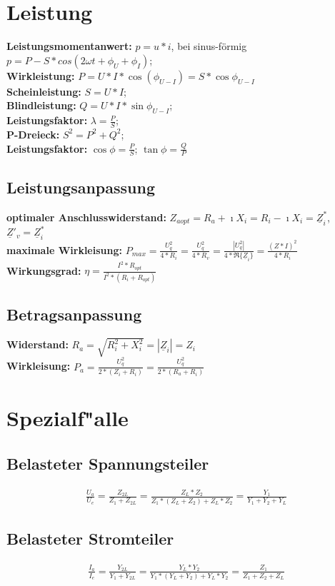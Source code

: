 \documentclass[10pt,a5paper]{article}
\begin{document}
\section{Leistung}
 \textbf{Leistungsmomentanwert:} $p=u*i$, bei sinus-förmig $p=P-S*cos(2\omega t+\phi_U+\phi_I)$; 
 \\\textbf{Wirkleistung:} $P=U*I*\cos(\phi_{U-I})=S*\cos\phi_{U-I}$
 \\\textbf{Scheinleistung:} $S=U*I$; 
 \\\textbf{Blindleistung:} $Q=U*I*\sin\phi_{U-I}$; 
 \\\textbf{Leistungsfaktor:} $\lambda=\frac{P}{S}$; 
 \\\textbf{P-Dreieck:} $S^2=P^2+Q^2$;
 \\\textbf{Leistungsfaktor:} $\cos\phi=\frac{P}{S}$; $\tan\phi=\frac{Q}{P}$
 \subsection{Leistungsanpassung}
 \textbf{optimaler Anschlusswiderstand:} \ensuremath{Z_{aopt}=R_a+\imath X_i=R_i-\imath X_i=\underline{Z}^*_i}, \ensuremath{\underline{Z}'_v=\underline{Z}^*_i}
 \\\textbf{maximale Wirkleisung:} \ensuremath{P_{max}=\frac{U^2_q}{4*R_i}=\frac{U^2_q}{4*R_v}=\frac{|U^2_q|}{4*\Re\{\underline{Z}_i\}}=\frac{(Z*I)^2}{4*R_i}}
 \\\textbf{Wirkungsgrad:} \ensuremath{\eta=\frac{I^2*R_{opt}}{I^2*(R_i+R_{opt})}}
 \subsection{Betragsanpassung}
 \textbf{Widerstand:} \ensuremath{R_a=\sqrt{R^2_i+X^2_i}=|\underline{Z}_i|=Z_i}
 \\\textbf{Wirkleisung:} \ensuremath{P_a=\frac{U^2_q}{2*(Z_i+R_i)}=\frac{U^2_q}{2*(R_a+R_i)}}
 \newpage
 \section{Spezialf{"a}lle}
 \subsection{Belasteter Spannungsteiler}
 \begin{eqnarray}
 \frac{U_a}{U_e}=\frac{Z_{2L}}{Z_1+Z_{2L}}=\frac{Z_L*Z_2}{Z_1*(Z_L+Z_2)+Z_L*Z_2}=\frac{Y_1}{Y_1+Y_2+Y_L}
 \end{eqnarray}
 \subsection{Belasteter Stromteiler}
 \begin{eqnarray}
 \frac{I_a}{I_e}=\frac{Y_{2L}}{Y_1+Y_{2L}}=\frac{Y_L*Y_2}{Y_1*(Y_L+Y_2)+Y_L*Y_2}=\frac{Z_1}{Z_1+Z_2+Z_L}
 \end{eqnarray}
\end{document}
